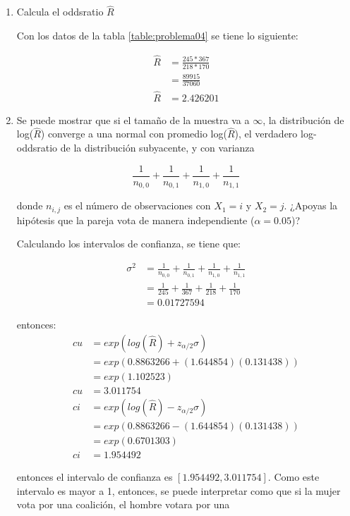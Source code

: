 \begin{enumerate}
	\item Calcula el oddsratio $\hat{R}$

	      Con los datos de la tabla \ref{table:problema04} se tiene lo siguiente:

	      \begin{align*}
		      \hat{R} & = \frac{245*367}{218*170} \\
		              & = \frac{89915}{37060}     \\
		      \hat{R} & = 2.426201
	      \end{align*}


	\item Se puede mostrar que si el tamaño de la muestra va a $\infty$, la distribución de log($\hat{R}$) converge a una normal con promedio log($\hat{R}$), el verdadero log-oddsratio de la distribución subyacente, y con varianza

	      \begin{equation*}
		      \frac{1}{n_{0,0}} + \frac{1}{n_{0,1}} + \frac{1}{n_{1,0}} + \frac{1}{n_{1,1}}
	      \end{equation*}

	      donde $n_{i,j}$ es el número de  observaciones con $X_1=i$ y $X_2=j$. ¿Apoyas la hipótesis que la pareja vota de manera independiente ($\alpha=0.05$)?

	      Calculando los intervalos de confianza, se tiene que:

	      \begin{align*}
		      \sigma^2 & = \frac{1}{n_{0,0}} + \frac{1}{n_{0,1}} + \frac{1}{n_{1,0}} + \frac{1}{n_{1,1}} \\
		               & = \frac{1}{245} + \frac{1}{367} + \frac{1}{218} + \frac{1}{170}                 \\
		               & = 0.01727594
	      \end{align*}

	      entonces:
	      \begin{align*}
		      cu & = exp(log(\hat{R}) + z_{\alpha/2} \sigma) \\
		         & = exp(0.8863266 + (1.644854)(0.131438) )  \\
		         & = exp(1.102523)                           \\
		      cu & = 3.011754                                \\
		      ci & = exp(log(\hat{R}) - z_{\alpha/2} \sigma) \\
		         & = exp(0.8863266 - (1.644854)(0.131438) )  \\
		         & = exp(0.6701303)                          \\
		      ci & = 1.954492
	      \end{align*}

	      entonces el intervalo de confianza es $[1.954492,3.011754]$. Como este intervalo es mayor a 1, entonces, se puede interpretar como que si la mujer vota por una coalición, el hombre votara por una
\end{enumerate}

